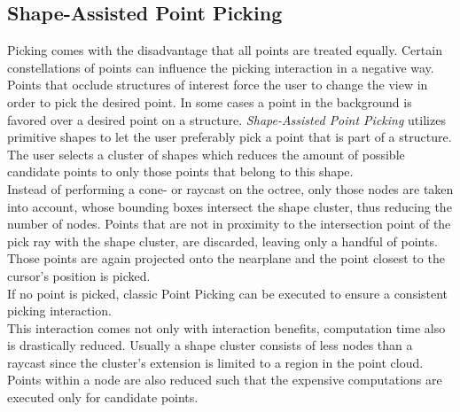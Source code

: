 \subsection{Shape-Assisted Point Picking}
Picking comes with the disadvantage that all points are treated equally. Certain constellations of points can influence the picking interaction in a negative way. Points that occlude structures of interest force the user to change the view in order to pick the desired point. In some cases a point in the background is favored over a desired point on a structure. 
 \textit{Shape-Assisted Point Picking} utilizes primitive shapes to let the user preferably pick a point that is part of a structure. The user selects a cluster of shapes which reduces the amount of possible candidate points to only those points that belong to this shape. 
\\
Instead of performing a cone- or raycast on the octree, only those nodes are taken into account, whose bounding boxes intersect the shape cluster, thus reducing the number of nodes. Points that are not in proximity to the intersection point of the pick ray with the shape cluster, are discarded, leaving only a handful of points. Those points are again projected onto the nearplane and the point closest to the cursor's position is picked. 
\\
If no point is picked, classic Point Picking can be executed to ensure a consistent picking interaction. 
\\
This interaction comes not only with interaction benefits, computation time also is drastically reduced. Usually a shape cluster consists of less nodes than a raycast since the cluster's extension is limited to a region in the point cloud. Points within a node are also reduced such that the expensive computations are executed only for candidate points. 


